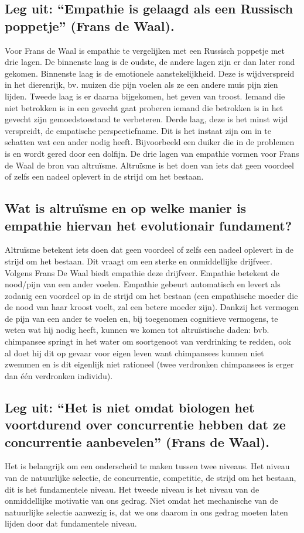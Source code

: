 \documentclass[11pt,a4paper,titlepage]{article}
\begin{document}
\subsection{Leg uit: “Empathie is gelaagd als een Russisch poppetje” (Frans de Waal).}
Voor Frans de Waal is empathie te vergelijken met een Russisch poppetje met drie lagen. De binnenste laag is de oudste, de andere lagen zijn er dan later rond gekomen. Binnenste laag is de emotionele aanstekelijkheid. Deze is wijdverspreid in het dierenrijk, bv. muizen die pijn voelen als ze een andere muis pijn zien lijden. Tweede laag is er daarna bijgekomen, het geven van troost. Iemand die niet betrokken is in een gevecht gaat proberen iemand die betrokken is in het gevecht zijn gemoedstoestand te verbeteren. Derde laag, deze is het minst wijd verspreidt, de empatische perspectiefname. Dit is het instaat zijn om in te schatten wat een ander nodig heeft. Bijvoorbeeld een duiker die in de problemen is en wordt gered door een dolfijn. De drie lagen van empathie vormen voor Frans de Waal de bron van altruïsme. Altruïsme is het doen van iets dat geen voordeel of zelfs een nadeel oplevert in de strijd om het bestaan.

\subsection{Wat is altruïsme en op welke manier is empathie hiervan het evolutionair fundament?}
Altruïsme betekent iets doen dat geen voordeel of zelfs een nadeel oplevert in de strijd om het bestaan. Dit vraagt om een sterke en onmiddellijke drijfveer. Volgens Frans De Waal biedt empathie deze drijfveer. Empathie betekent de nood/pijn van een ander voelen. Empathie gebeurt automatisch en levert als zodanig een voordeel op in de strijd om het bestaan (een empathische moeder die de nood van haar kroost voelt, zal een betere moeder zijn). Dankzij het vermogen de pijn van een ander te voelen en, bij toegenomen cognitieve vermogens, te weten wat hij nodig heeft, kunnen we komen tot altruïstische daden: bvb. chimpansee springt in het water om soortgenoot van verdrinking te redden, ook al doet hij dit op gevaar voor eigen leven want chimpansees kunnen niet zwemmen en is dit eigenlijk niet rationeel (twee verdronken chimpansees is erger dan één verdronken individu).

\subsection{Leg uit: “Het is niet omdat biologen het voortdurend over concurrentie hebben dat ze concurrentie aanbevelen” (Frans de Waal). }
Het is belangrijk om een onderscheid te maken tussen twee niveaus. Het niveau van de natuurlijke selectie, de concurrentie, competitie, de strijd om het bestaan, dit is het fundamentele niveau. Het tweede niveau is het niveau van de onmiddellijke motivatie van ons gedrag. Niet omdat het mechanische van de natuurlijke selectie aanwezig is, dat we ons daarom in ons gedrag moeten laten lijden door dat fundamentele niveau.
\end{document}
